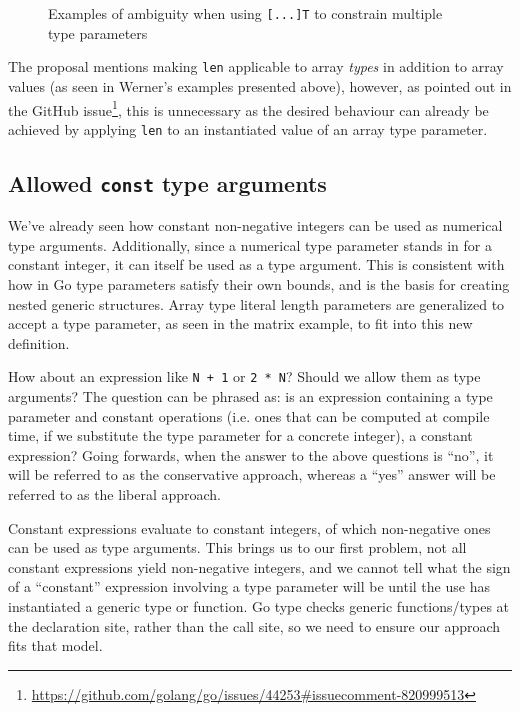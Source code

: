\begin{figure}
    \caption{Examples of ambiguity when using \texttt{[...]T} to constrain
        multiple type parameters}
    \label{fig:werner-ambiguity}
\end{figure}

The proposal mentions making \texttt{len} applicable to array \emph{types} in
addition to array values (as seen in Werner's examples presented above),
however, as pointed out in the GitHub
issue\footnote{\url{https://github.com/golang/go/issues/44253\#issuecomment-820999513}},
this is unnecessary as the desired behaviour can already be achieved by applying
\texttt{len} to an instantiated value of an array type parameter.

\subsection{Allowed \texttt{const} type arguments}

We've already seen how constant non-negative integers can be used as numerical
type arguments. Additionally, since a numerical type parameter stands in for a
constant integer, it can itself be used as a type argument. This is consistent
with how in Go type parameters satisfy their own bounds, and is the basis for
creating nested generic structures. Array type literal length parameters are
generalized to accept a  type parameter, as seen in the matrix
example, to fit into this new definition.

How about an expression like \texttt{N + 1} or \texttt{2 * N}? Should we allow
them as  type arguments? The question can be phrased as: is an
expression containing a  type parameter and constant operations (i.e.
ones that can be computed at compile time, if we substitute the type parameter
for a concrete integer), a constant expression? Going forwards, when the answer
to the above questions is ``no'', it will be referred to as the conservative
approach, whereas a ``yes'' answer will be referred to as the liberal approach.

Constant expressions evaluate to constant integers, of which non-negative ones
can be used as  type arguments. This brings us to our first problem,
not all constant expressions yield non-negative integers, and we cannot tell
what the sign of a ``constant'' expression involving a type parameter will be
until the use has instantiated a generic type or function. Go type checks
generic functions/types at the declaration site, rather than the call site, so
we need to ensure our approach fits that model.

